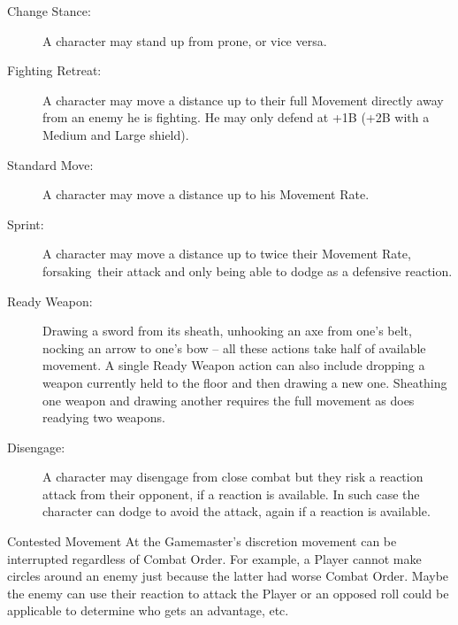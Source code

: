 \begin{description}
\item[Change Stance:] A character may stand up from prone, or vice versa.
\item[Fighting Retreat:] A character may move a distance up to their full Movement directly away from an enemy he is fighting. He may only defend at +1B (+2B with a Medium and Large shield).
\item[Standard Move:] A character may move a distance up to his Movement Rate.
\item[Sprint:] A character may move a distance up to twice their Movement Rate, forsaking their attack and only being able to dodge as a defensive reaction.
\item[Ready Weapon:] Drawing a sword from its sheath, unhooking an axe from one’s belt, nocking an arrow to one’s bow – all these actions take half of available movement. A single Ready Weapon action can also include dropping a weapon currently held to the floor and then drawing a new one. Sheathing one weapon and drawing another requires the full movement as does readying two weapons.
\item[Disengage:] A character may disengage from close combat but they risk a reaction attack from their opponent, if a reaction is available. In such case the character can dodge to avoid the attack, again if a reaction is available.
\end{description}

\begin{rpg-titlebox}{Contested Movement}
At the Gamemaster's discretion movement can be interrupted regardless of Combat Order. For example, a Player cannot make circles around an enemy just because the latter had worse Combat Order. Maybe the enemy can use their reaction to attack the Player or an opposed roll could be applicable to determine who gets an advantage, etc.
\end{rpg-titlebox}


